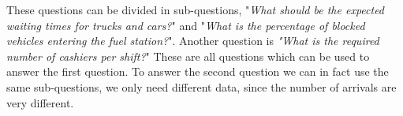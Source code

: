These questions can be divided in sub-questions, "\textit{What should be the expected waiting times for trucks and cars?}" and "\textit{What is the percentage of blocked vehicles entering the fuel station?}".
Another question is \textit{"What is the required number of cashiers per shift?}"
These are all questions which can be used to answer the first question.
To answer the second question we can in fact use the same sub-questions, we only need different data, since the number of arrivals are very different.
